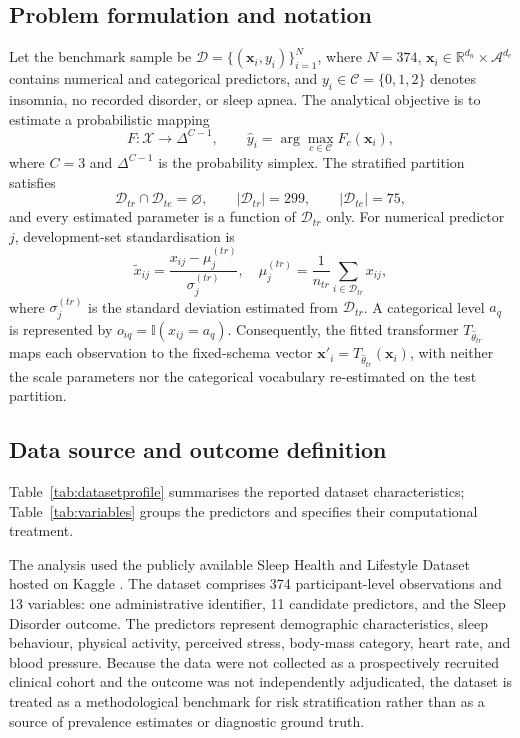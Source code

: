 \documentclass[a4paper,fleqn]{cas-dc}
\begin{document}
\subsection{Problem formulation and notation}
Let the benchmark sample be $\mathcal{D}=\{(\mathbf{x}_i,y_i)\}_{i=1}^{N}$, where $N=374$, $\mathbf{x}_i\in\mathbb{R}^{d_n}\times\mathcal{A}^{d_c}$ contains numerical and categorical predictors, and $y_i\in\mathcal{C}=\{0,1,2\}$ denotes insomnia, no recorded disorder, or sleep apnea. The analytical objective is to estimate a probabilistic mapping
\begin{equation}
F:\mathcal{X}\rightarrow\Delta^{C-1},\qquad
\hat y_i=\arg\max_{c\in\mathcal{C}}F_c(\mathbf{x}_i),
\label{eq:problem}
\end{equation}
where $C=3$ and $\Delta^{C-1}$ is the probability simplex. The stratified partition satisfies
\begin{equation}
\mathcal{D}_{tr}\cap\mathcal{D}_{te}=\varnothing,
\qquad |\mathcal{D}_{tr}|=299,
\qquad |\mathcal{D}_{te}|=75,
\label{eq:partition}
\end{equation}
and every estimated parameter is a function of $\mathcal{D}_{tr}$ only. For numerical predictor $j$, development-set standardisation is
\begin{equation}
\widetilde{x}_{ij}=\frac{x_{ij}-\mu^{(tr)}_j}{\sigma^{(tr)}_j},
\quad
\mu^{(tr)}_j=\frac{1}{n_{tr}}\sum_{i\in\mathcal{D}_{tr}}x_{ij},
\label{eq:standardise}
\end{equation}
where $\sigma^{(tr)}_j$ is the standard deviation estimated from $\mathcal{D}_{tr}$. A categorical level $a_q$ is represented by $o_{iq}=\mathbb{I}(x_{ij}=a_q)$. Consequently, the fitted transformer $T_{\widehat{\theta}_{tr}}$ maps each observation to the fixed-schema vector $\mathbf{x}'_i=T_{\widehat{\theta}_{tr}}(\mathbf{x}_i)$, with neither the scale parameters nor the categorical vocabulary re-estimated on the test partition.

\subsection{Data source and outcome definition}
\label{sec:data}
Table~\ref{tab:datasetprofile} summarises the reported dataset characteristics; Table~\ref{tab:variables} groups the predictors and specifies their computational treatment.

The analysis used the publicly available Sleep Health and Lifestyle Dataset hosted on Kaggle \cite{kaggle2023}. The dataset comprises 374 participant-level observations and 13 variables: one administrative identifier, 11 candidate predictors, and the Sleep Disorder outcome. The predictors represent demographic characteristics, sleep behaviour, physical activity, perceived stress, body-mass category, heart rate, and blood pressure. Because the data were not collected as a prospectively recruited clinical cohort and the outcome was not independently adjudicated, the dataset is treated as a methodological benchmark for risk stratification rather than as a source of prevalence estimates or diagnostic ground truth.
\end{document}
